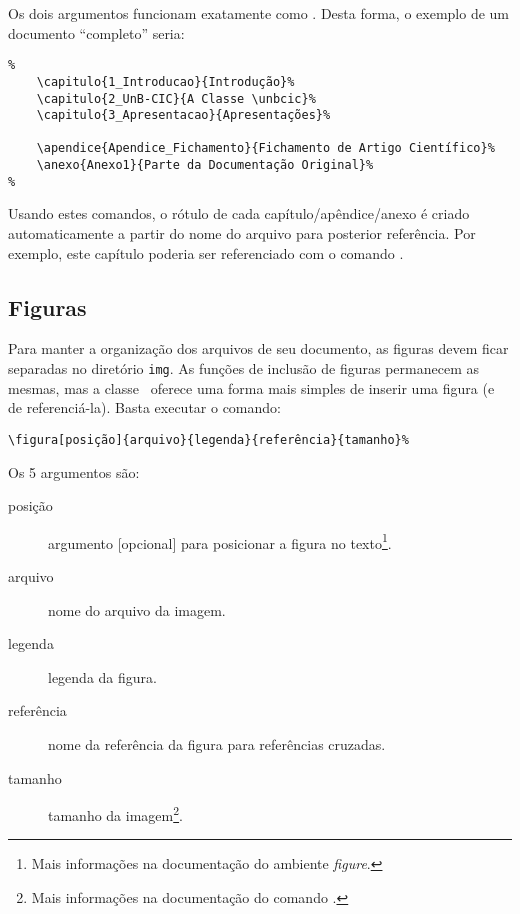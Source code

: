 Os dois argumentos funcionam exatamente como . Desta forma,
o exemplo de um documento ``completo'' seria: %

\begin{verbatim}
%
    \capitulo{1_Introducao}{Introdução}%
    \capitulo{2_UnB-CIC}{A Classe \unbcic}%
    \capitulo{3_Apresentacao}{Apresentações}%

    \apendice{Apendice_Fichamento}{Fichamento de Artigo Científico}%
    \anexo{Anexo1}{Parte da Documentação Original}%
%
\end{verbatim}

Usando estes comandos, o rótulo de cada capítulo/apêndice/anexo é criado
automaticamente a partir do nome do arquivo para posterior referência. Por exemplo,
este capítulo poderia ser referenciado com o comando .

\subsection{Figuras}
Para manter a organização dos arquivos de seu documento, as figuras devem ficar
separadas no diretório \texttt{img}. As funções de inclusão de figuras permanecem
as mesmas, mas a classe \unbcic\ oferece uma forma mais simples de inserir uma
figura (e de referenciá-la). Basta executar o comando:

\begin{verbatim}
\figura[posição]{arquivo}{legenda}{referência}{tamanho}%
\end{verbatim}

Os 5 argumentos são:
\begin{description}
\item[posição] argumento [opcional] para posicionar a figura no texto\footnote{Mais
informações na documentação do ambiente \emph{figure}.}.
\item[arquivo] nome do arquivo da imagem.
\item[legenda] legenda da figura.
\item[referência] nome da referência da figura para referências cruzadas.
\item[tamanho] tamanho da imagem\footnote{Mais informações na documentação do comando
.}.
\end{description}

